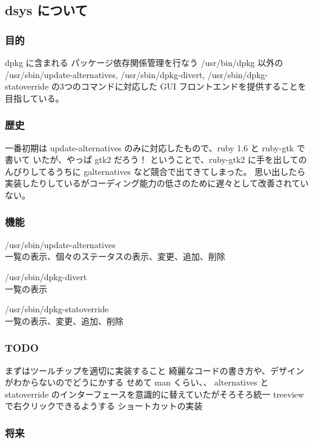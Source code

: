 \documentclass[mingoth]{jsarticle}
\begin{document}
\subsection{dsys について}

\subsubsection{目的}

   dpkg に含まれる パッケージ依存関係管理を行なう /usr/bin/dpkg 以外の
   /usr/sbin/update-alternatives, /usr/sbin/dpkg-divert, /usr/sbin/dpkg-statoverride
   の3つのコマンドに対応した GUI フロントエンドを提供することを目指している。

\subsubsection{歴史}

   一番初期は update-alternatives のみに対応したもので、ruby 1.6 と ruby-gtk で書いて
   いたが、やっぱ gtk2 だろう！ ということで、ruby-gtk2 に手を出してのんびりしてるうちに
   galternatives など競合で出てきてしまった。
   思い出したら実装したりしているがコーディング能力の低さのために遅々として改善されていない。

\subsubsection{機能}

   /usr/sbin/update-alternatives\\
     一覧の表示、個々のステータスの表示、変更、追加、削除

   /usr/sbin/dpkg-divert\\
     一覧の表示

   /usr/sbin/dpkg-statoverride\\
     一覧の表示、変更、追加、削除

\subsubsection{TODO}

     まずはツールチップを適切に実装すること
     綺麗なコードの書き方や、デザインがわからないのでどうにかする
     せめて man くらい、、
     alternatives と statoverride のインターフェースを意識的に替えていたがそろそろ統一
     treeview で右クリックできるようする
     ショートカットの実装

\subsubsection{将来}
\end{document}
